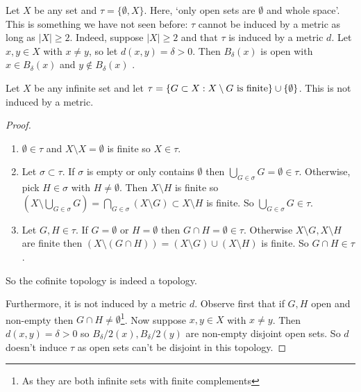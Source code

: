 \begin{example}
    Let $X$ be any set and $\tau = \{\emptyset, X\}$. Here, `only open sets are $\emptyset$ and whole space'.
    This is something we have not seen before: $\tau$ cannot be induced by a metric as long as $|X| \geq 2$.
    Indeed, suppose $|X|  \geq 2$ and that $\tau$ is induced by a metric $d$.
    Let $x,y \in X$ with $x\neq y$, so let $d(x,y) = \delta>0$.
    Then $B_\delta(x)$ is open with $x \in B_\delta(x)$ and $y \not\in B_\delta(x)$ \Lightning.
\end{example} 

\begin{example}
    Let $X$ be any infinite set and let $\tau = \{G\subset X : X \setminus G \textup{ is finite} \} \cup \{\emptyset\}$.
    This is not induced by a metric.

    \begin{proof}
        \begin{enumerate}
            \item $\emptyset\in\tau$ and $X \setminus X = \emptyset$ is finite so $X\in\tau$.
            \item Let $\sigma \subset\tau$. If $\sigma$ is empty or only contains $\emptyset$ then $\bigcup_{G\in \sigma} G = \emptyset\in \tau$. 
            Otherwise, pick $H\in \sigma$ with $H\neq \emptyset$. Then $X \setminus H$ is finite so $(X \setminus\bigcup_{G\in \sigma} G) = \bigcap_{G\in \sigma} (X \setminus G)\subset X \setminus H$ is finite. So $\bigcup_{G\in \sigma} G \in \tau.$
            \item Let $G,H\in \tau$. If $G = \emptyset$ or $H=\emptyset$ then $G\cap H = \emptyset\in\tau$. Otherwise $X \setminus G, X \setminus H$ are finite then $(X \setminus(G\cap H)) = (X \setminus G)\cup(X \setminus H)$ is finite. So $G\cap H\in \tau$.
        \end{enumerate}

        So the cofinite topology is indeed a topology.
        
        Furthermore, it is not induced by a metric $d$. 
        Observe first that if $G,H$ open and non-empty then $G\cap H\neq \emptyset$\footnote{As they are both infinite sets with finite complements}. 
        Now suppose $x, y \in X$ with $x \neq y$.
        Then $d(x,y) = \delta > 0$ so $B_\delta/2(x), B_\delta/2(y)$ are non-empty disjoint open sets. So $d$ doesn't induce $\tau$ as open sets can't be disjoint in this topology.
        \end{proof}
\end{example} 

